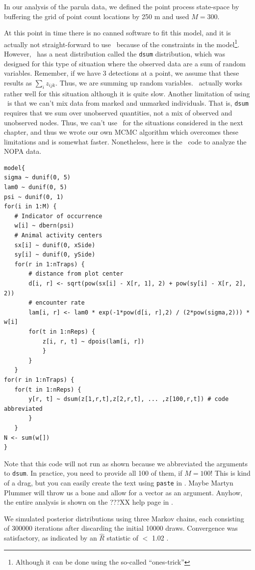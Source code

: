 In our analysis of the parula data, we defined the point process
state-space by buffering the grid of point
count locations by 250 m and used $M=300$.

At this point in time there is no canned software to fit this model,
and it is actually not straight-forward to use \bugs~because of the
constraints in the model\footnote{Although it can be done using the
  so-called ``ones-trick''}. However, \jags~has a neat distribution
called the \verb+dsum+ distribution, which was designed for this type
of situation where the observed data are a sum of random
variables. Remember, if we have 3 detections at a point, we assume
that these results as $\sum_i z_{ijk}$. Thus, we are summing up random
variables. \jags~actually works rather well for this situation
although it is quite slow. Another limitation of using \jags~is that
we can't mix data from marked and unmarked individuals. That is,
\verb+dsum+ requires that we sum over unobserved quantities, not a mix
of observed and unobserved nodes. Thus, we can't use \jags~for the
situations considered in the next chapter, and thus we wrote our own
MCMC algorithm which overcomes these limitations and is somewhat
faster. Nonetheless, here is the \jags~code to analyze the NOPA data.

\begin{verbatim}
model{
sigma ~ dunif(0, 5)
lam0 ~ dunif(0, 5)
psi ~ dunif(0, 1)
for(i in 1:M) {
   # Indicator of occurrence
   w[i] ~ dbern(psi)
   # Animal activity centers
   sx[i] ~ dunif(0, xSide)
   sy[i] ~ dunif(0, ySide)
   for(r in 1:nTraps) {
       # distance from plot center
       d[i, r] <- sqrt(pow(sx[i] - X[r, 1], 2) + pow(sy[i] - X[r, 2], 2))
       # encounter rate
       lam[i, r] <- lam0 * exp(-1*pow(d[i, r],2) / (2*pow(sigma,2))) * w[i]
       for(t in 1:nReps) {
           z[i, r, t] ~ dpois(lam[i, r])
           }
       }
   }
for(r in 1:nTraps) {
   for(t in 1:nReps) {
       y[r, t] ~ dsum(z[1,r,t],z[2,r,t], ... ,z[100,r,t]) # code abbreviated
       }
   }
N <- sum(w[])
}
\end{verbatim}

Note that this code will not run as shown because we abbreviated the
arguments to \verb+dsum+. In practice, you need to provide all 100 of
them, if $M=100$! This is kind of a drag, but you can easily create
the text using \verb+paste+ in \R. Maybe Martyn Plummer will throw us
a bone and allow for a vector as an argument. Anyhow, the entire
analysis is shown on the ???XX help page in \scrbook.


We simulated posterior
distributions using three Markov chains,
each consisting of 300000 iterations after discarding the initial 10000
draws. Convergence was satisfactory, as indicated by an $\hat{R}$
statistic of $<$ 1.02 \citep{gelman_rubin:1992}.


